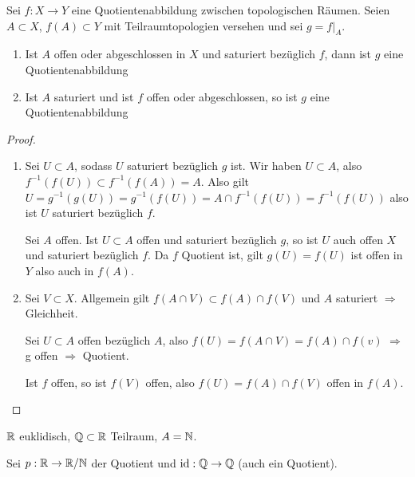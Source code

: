 \begin{stz}
    Sei $f:X\to Y$ eine Quotientenabbildung zwischen topologischen Räumen. Seien
    $A\subset X$, $f(A)\subset Y$ mit Teilraumtopologien versehen und sei $g =
    f|_A$.
    \begin{enumerate}
        \item Ist $A$ offen oder abgeschlossen in $X$ und saturiert bezüglich
            $f$, dann ist $g$ eine Quotientenabbildung
        \item Ist $A$ saturiert und ist $f$ offen oder abgeschlossen, so ist $g$
            eine Quotientenabbildung
    \end{enumerate}
    \begin{proof}
        \begin{enumerate}
            \item Sei $U\subset A$, sodass $U$ saturiert bezüglich $g$ ist. Wir
                haben $U\subset A$, also $f^{-1}(f(U))\subset f^{-1}(f(A)) = A$.
                Also gilt $U = g^{-1}(g(U)) = g^{-1}(f(U)) = A \cap
                f^{-1}(f(U)) = f^{-1}(f(U))$ also ist $U$ saturiert bezüglich
                $f$.
                
                Sei $A$ offen. Ist $U\subset A$ offen und saturiert bezüglich
                $g$, so ist $U$ auch offen $X$ und saturiert bezüglich $f$. Da
                $f$ Quotient ist, gilt $g(U) = f(U)$ ist offen in $Y$ also auch
                in $f(A)$.
            \item Sei $V\subset X$. Allgemein gilt $f(A\cap V)\subset f(A) \cap
                f(V)$ und $A$ saturiert $\Rightarrow$ Gleichheit.

                Sei $U\subset A$ offen bezüglich $A$, also $f(U) = f(A\cap V) =
                f(A) \cap f(v)$ $\Rightarrow$ g offen $\Rightarrow$ Quotient.

                Ist $f$ offen, so ist $f(V)$ offen, also $f(U) = f(A) \cap f(V)$
                offen in $f(A)$.
        \end{enumerate}
    \end{proof}
    \begin{bsp}
        $\mathbb{R}$ euklidisch, $\mathbb{Q}\subset \mathbb{R}$ Teilraum, $A = \mathbb{N}$.

        Sei $p:\mathbb{R}\to\mathbb{R}/\mathbb{N}$ der Quotient und $\operatorname{id} : \mathbb{Q}\to\mathbb{Q}$ (auch
        ein Quotient).


\end{bsp}
\end{stz}
